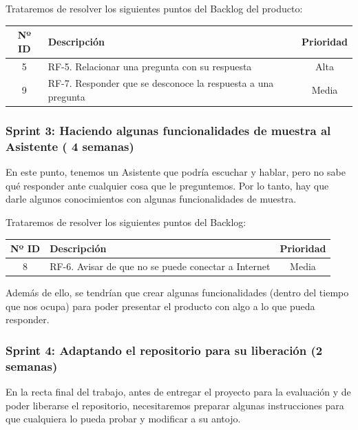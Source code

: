 Trataremos de resolver los siguientes puntos del Backlog del producto:
\begin{table}[H]
	\begin{tabularx}{\textwidth}{|c|X|c|}
		\hline
		\textbf{Nº ID} & \textbf{Descripción} & \textbf{Prioridad} \\
		\hline
			5 & RF-5. Relacionar una pregunta con su respuesta & Alta \\
		\hline
			9 & RF-7. Responder que se desconoce la respuesta a una pregunta & Media \\
		\hline
	\end{tabularx}
\end{table}

\subsubsection{Sprint 3: Haciendo algunas funcionalidades de muestra al Asistente ( 4 semanas)}

En este punto, tenemos un Asistente que podría escuchar y hablar, pero no sabe qué responder ante cualquier cosa que le preguntemos. Por lo tanto, hay que darle algunos conocimientos con algunas funcionalidades de muestra.

Trataremos de resolver los siguientes puntos del Backlog:
\begin{table}[H]
	\begin{tabularx}{\textwidth}{|c|X|c|}
		\hline
		\textbf{Nº ID} & \textbf{Descripción} & \textbf{Prioridad} \\
		\hline
			8 & RF-6. Avisar de que no se puede conectar a Internet & Media \\
		\hline
	\end{tabularx}
\end{table}

Además de ello, se tendrían que crear algunas funcionalidades (dentro del tiempo que nos ocupa) para poder presentar el producto con algo a lo que pueda responder.

\subsubsection{Sprint 4: Adaptando el repositorio para su liberación (2 semanas)}

En la recta final del trabajo, antes de entregar el proyecto para la evaluación y de poder liberarse el repositorio, necesitaremos preparar algunas instrucciones para que cualquiera lo pueda probar y modificar a su antojo.

